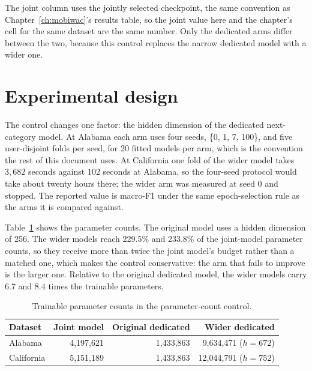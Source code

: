 The joint column uses the jointly selected checkpoint, the same convention as
Chapter~\ref{ch:mobiwac}'s results table, so the joint value here and the chapter's cell for the
same dataset are the same number. Only the dedicated arms differ between the two, because this
control replaces the narrow dedicated model with a wider one.

\section{Experimental design}
\label{sec:apx-parameter-design}

The control changes one factor: the hidden dimension of the dedicated
next-category model. At Alabama each arm uses four seeds, \{0, 1, 7, 100\}, and five
user-disjoint folds per seed, for 20 fitted models per arm, which is the convention the rest of
this document uses. At California one fold of the wider model takes $3{,}682$ seconds against
$102$ seconds at Alabama, so the four-seed protocol would take about twenty hours there; the
wider arm was measured at seed 0 and stopped. The reported value is macro-F1 under the same
epoch-selection rule as the arms it is compared against.

Table~\ref{tab:apx-parameter-counts} shows the parameter counts. The original model
uses a hidden dimension of 256. The wider models reach 229.5\% and 233.8\% of the
joint-model parameter counts, so they receive more than twice the joint model's budget rather than a
matched one, which makes the control conservative: the arm that fails to improve is the larger one.
Relative to the original dedicated model, the wider models carry $6.7$ and $8.4$ times the trainable
parameters.

\begin{table}[H]
    \centering
    \caption{Trainable parameter counts in the parameter-count control.}
    \label{tab:apx-parameter-counts}
    \begin{tabular}{lrrr}
        \toprule
        Dataset & Joint model & Original dedicated & Wider dedicated \\
        \midrule
        Alabama    & 4,197,621 & 1,433,863 & 9,634,471 ($h=672$) \\
        California & 5,151,189 & 1,433,863 & 12,044,791 ($h=752$) \\
        \bottomrule
    \end{tabular}
\end{table}

